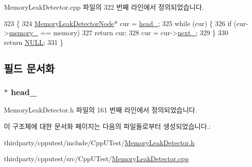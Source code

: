 Memory\+Leak\+Detector.\+cpp 파일의 322 번째 라인에서 정의되었습니다.


\begin{DoxyCode}
323 \{
324   \hyperlink{struct_memory_leak_detector_node}{MemoryLeakDetectorNode}* cur = \hyperlink{struct_memory_leak_detector_list_a8f541a6917dfc908c587dd3f7e86c990}{head\_};
325   \textcolor{keywordflow}{while} (cur) \{
326     \textcolor{keywordflow}{if} (cur->\hyperlink{struct_memory_leak_detector_node_a6cdb5ad30702010eaf86e4e5f26defce}{memory\_} == memory)
327       \textcolor{keywordflow}{return} cur;
328     cur = cur->\hyperlink{struct_memory_leak_detector_node_a6a718fbf408f23d29c6ef9167005968c}{next\_};
329   \}
330   \textcolor{keywordflow}{return} \hyperlink{openavb__types__base__pub_8h_a070d2ce7b6bb7e5c05602aa8c308d0c4}{NULL};
331 \}
\end{DoxyCode}


\subsection{필드 문서화}
\subsubsection[{\texorpdfstring{head\+\_\+}{head_}}]{$\ast$ head\+\_\+\hspace{0.3cm}{\ttfamily [private]}}\hypertarget{struct_memory_leak_detector_list_a8f541a6917dfc908c587dd3f7e86c990}{}\label{struct_memory_leak_detector_list_a8f541a6917dfc908c587dd3f7e86c990}


Memory\+Leak\+Detector.\+h 파일의 161 번째 라인에서 정의되었습니다.



이 구조체에 대한 문서화 페이지는 다음의 파일들로부터 생성되었습니다.\+:\begin{DoxyCompactItemize}
\item 
thirdparty/cpputest/include/\+Cpp\+U\+Test/\hyperlink{_memory_leak_detector_8h}{Memory\+Leak\+Detector.\+h}\item 
thirdparty/cpputest/src/\+Cpp\+U\+Test/\hyperlink{_memory_leak_detector_8cpp}{Memory\+Leak\+Detector.\+cpp}\end{DoxyCompactItemize}
